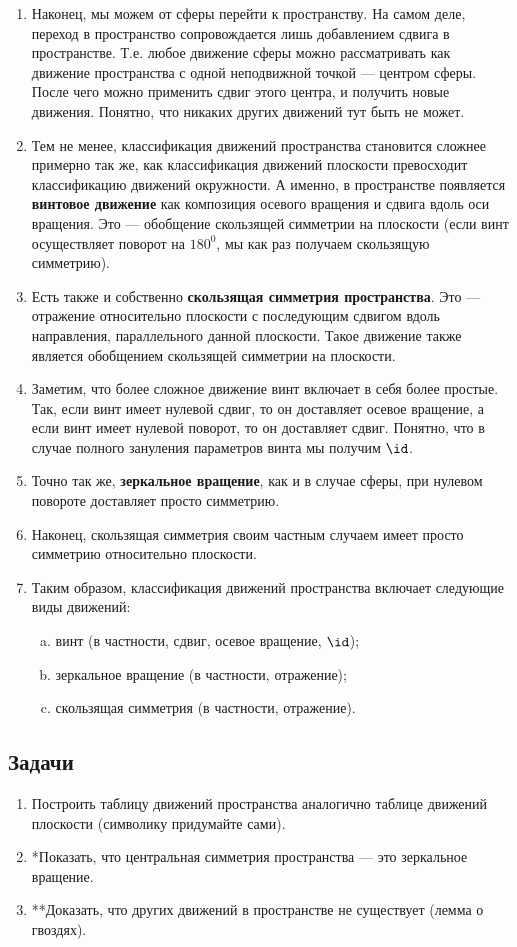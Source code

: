 \begin{enumerate}
\item Наконец, мы можем от сферы перейти к пространству. На самом деле, переход в пространство сопровождается лишь добавлением сдвига в пространстве. Т.е. любое движение сферы можно рассматривать как движение пространства с одной неподвижной точкой --- центром сферы. После чего можно применить сдвиг этого центра, и получить новые движения. Понятно, что никаких других движений тут быть не может.
\item Тем не менее, классификация движений пространства становится сложнее примерно так же, как классификация движений плоскости превосходит классификацию движений окружности. А именно, в пространстве появляется \textbf{винтовое движение} как композиция осевого вращения и сдвига вдоль оси вращения. Это --- обобщение скользящей симметрии на плоскости (если винт осуществляет поворот на $180^0$, мы как раз получаем скользящую симметрию).
\item Есть также и собственно \textbf{скользящая симметрия пространства}. Это --- отражение относительно плоскости с последующим сдвигом вдоль направления, параллельного данной плоскости. Такое движение также является обобщением скользящей симметрии на плоскости.
\item Заметим, что более сложное движение винт включает в себя более простые. Так, если винт имеет нулевой сдвиг, то он доставляет осевое вращение, а если винт имеет нулевой поворот, то он доставляет сдвиг. Понятно, что в случае полного зануления параметров винта мы получим $\id$.
\item Точно так же, \textbf{зеркальное вращение}, как и в случае сферы, при нулевом повороте доставляет просто симметрию.
\item Наконец, скользящая симметрия своим частным случаем имеет просто симметрию относительно плоскости.
\item Таким образом, классификация движений пространства включает следующие виды движений:
\begin{enumerate}[a)]
\item винт (в частности, сдвиг, осевое вращение, $\id$);
\item зеркальное вращение (в частности, отражение);
\item скользящая симметрия (в частности, отражение).
\end{enumerate}
\end{enumerate}

\subsection*{Задачи}
\begin{enumerate}
\item Построить таблицу движений пространства аналогично таблице движений плоскости (символику придумайте сами).
\item *Показать, что центральная симметрия пространства --- это зеркальное вращение.
\item **Доказать, что других движений в пространстве не существует (лемма о гвоздях).
\end{enumerate}


